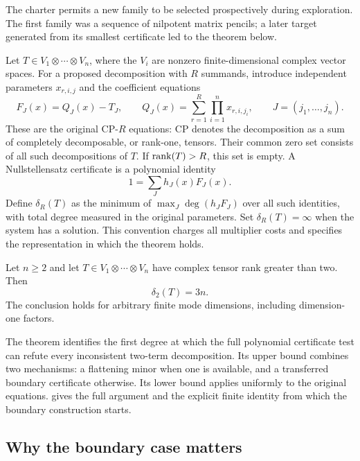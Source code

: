 The charter permits a new family to be selected prospectively during exploration. The first family was a sequence of nilpotent matrix pencils; a later target generated from its smallest certificate led to the theorem below.

Let $T\in V_1\otimes\cdots\otimes V_n$, where the $V_i$ are nonzero finite-dimensional complex vector spaces. For a proposed decomposition with $R$ summands, introduce independent parameters $x_{r,i,j}$ and the coefficient equations
\begin{equation}\label{eq:raw-cp}
 F_J(x)=Q_J(x)-T_J,\qquad
 Q_J(x)=\sum_{r=1}^{R}\prod_{i=1}^{n}x_{r,i,j_i},
 \qquad J=(j_1,\ldots,j_n).
\end{equation}
These are the original CP-$R$ equations: CP denotes the decomposition as a sum of completely decomposable, or rank-one, tensors. Their common zero set consists of all such decompositions of $T$. If $\operatorname{rank}(T)>R$, this set is empty. A Nullstellensatz certificate is a polynomial identity
\begin{equation}\label{eq:unit-certificate}
 1=\sum_J h_J(x)F_J(x).
\end{equation}
Define $\delta_R(T)$ as the minimum of $\max_J\deg(h_JF_J)$ over all such identities, with total degree measured in the original parameters. Set $\delta_R(T)=\infty$ when the system has a solution. This convention charges all multiplier costs and specifies the representation in which the theorem holds.

\begin{theorem}\label{thm:main}
Let $n\ge2$ and let $T\in V_1\otimes\cdots\otimes V_n$ have complex tensor rank greater than two. Then
\begin{equation}\label{eq:main-degree}
                       \delta_2(T)=3n.
\end{equation}
The conclusion holds for arbitrary finite mode dimensions, including dimension-one factors.
\end{theorem}

The theorem identifies the first degree at which the full polynomial certificate test can refute every inconsistent two-term decomposition. Its upper bound combines two mechanisms: a flattening minor when one is available, and a transferred boundary certificate otherwise. Its lower bound applies uniformly to the original equations.  gives the full argument and the explicit finite identity from which the boundary construction starts.

\subsection{Why the boundary case matters}\label{sec:boundary}

